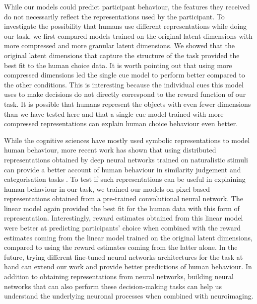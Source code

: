 \documentclass[10pt]{article}
\begin{document}
While our models could predict participant behaviour, the features they received do not necessarily reflect the representations used by the participant. To investigate the possibility that humans use different representations while doing our task, we first compared models trained on the original latent dimensions with more compressed and more granular latent dimensions. We showed that the original latent dimensions that capture the structure of the task provided the best fit to the human choice data. It is worth pointing out that using more compressed dimensions led the single cue model to perform better compared to the other conditions. This is interesting because the individual cues this model uses to make decisions do not directly correspond to the reward function of our task. It is possible that humans represent the objects with even fewer dimensions than we have tested here and that a single cue model trained with more compressed representations can explain human choice behaviour even better.  

While the cognitive sciences have mostly used symbolic representations to model human behaviour, more recent work has shown that using distributed representations obtained by deep neural networks trained on naturalistic stimuli can provide a better account of human behaviour in similarity judgement \citep{peterson_evaluating_2018} and categorisation tasks \citep{battleday_capturing_2020}. To test if such representations can be useful in explaining human behaviour in our task, we trained our models on pixel-based representations obtained from a pre-trained convolutional neural network. The linear model again provided the best fit for the human data with this form of representation. Interestingly, reward estimates obtained from this linear model were better at predicting participants' choice when combined with the reward estimates coming from the linear model trained on the original latent dimensions, compared to using the reward estimates coming from the latter alone. In the future, trying different fine-tuned neural networks architectures for the task at hand can extend our work and provide better predictions of human behaviour. In addition to obtaining representations from neural networks, building neural networks that can also perform these decision-making tasks can help us understand the underlying neuronal processes when combined with neuroimaging.
\end{document}

